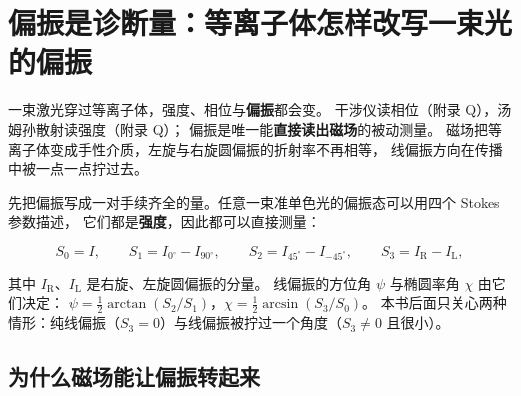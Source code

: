 
\section{偏振是诊断量：等离子体怎样改写一束光的偏振}
\label{sec:app-an-polarization}

一束激光穿过等离子体，强度、相位与\textbf{偏振}都会变。
干涉仪读相位（附录 Q），汤姆孙散射读强度（附录 Q）；
偏振是唯一能\textbf{直接读出磁场}的被动测量。
磁场把等离子体变成手性介质，左旋与右旋圆偏振的折射率不再相等，
线偏振方向在传播中被一点一点拧过去。

先把偏振写成一对手续齐全的量。任意一束准单色光的偏振态可以用四个 Stokes 参数描述，
它们都是\textbf{强度}，因此都可以直接测量：

\begin{equation}
S_0=I,\qquad
S_1=I_{0^\circ}-I_{90^\circ},\qquad
S_2=I_{45^\circ}-I_{-45^\circ},\qquad
S_3=I_{\mathrm{R}}-I_{\mathrm{L}},
\label{eq:app-an-stokes}
\end{equation}

其中 $I_{\mathrm{R}}$、$I_{\mathrm{L}}$ 是右旋、左旋圆偏振的分量。
线偏振的方位角 $\psi$ 与椭圆率角 $\chi$ 由它们决定：
$\psi=\frac12\arctan(S_2/S_1)$，$\chi=\frac12\arcsin(S_3/S_0)$。
本书后面只关心两种情形：纯线偏振（$S_3=0$）与线偏振被拧过一个角度（$S_3\neq0$ 且很小）。

\subsection{为什么磁场能让偏振转起来}

